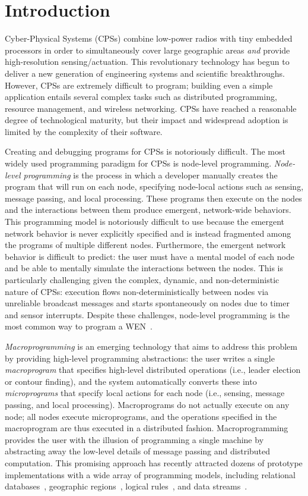 \chapter{Introduction}

Cyber-Physical Systems (CPSs) combine low-power radios with tiny embedded
processors in order to simultaneously cover large geographic areas {\em and}
provide high-resolution sensing/actuation.  This revolutionary technology has
begun to deliver a new generation of engineering systems and scientific
breakthroughs.  However, CPSs are extremely difficult to program; building even
a simple application entails several complex tasks such as distributed
programming, resource management, and wireless networking.  CPSs have reached a
reasonable degree of technological maturity, but their impact and widespread
adoption is limited by the complexity of their software.

Creating and debugging programs for CPSs is notoriously difficult. The most
widely used programming paradigm for CPSs is node-level
programming. \emph{Node-level programming} is the process in which a developer
manually creates the program that will run on each node, specifying node-local
actions such as sensing, message passing, and local processing.  These programs
then execute on the nodes and the interactions between them produce emergent,
network-wide behaviors.  This programming model is notoriously difficult to use
because the emergent network behavior is never explicitly specified and is
instead fragmented among the programs of multiple different nodes.  Furthermore,
the emergent network behavior is difficult to predict: the user must have a
mental model of each node and be able to mentally simulate the interactions
between the nodes.  This is particularly challenging given the complex, dynamic,
and non-deterministic nature of CPSs: execution flows non-deterministically
between nodes via unreliable broadcast messages and starts spontaneously on
nodes due to timer and sensor interrupts.  Despite these challenges, node-level
programming is the most common way to program a
WEN~\cite{Gay,bhatti2005mem,dunkels2004cla}.

{\em Macroprogramming} is an emerging technology that aims to address this
problem by providing high-level programming abstractions: the user writes a
single {\em macroprogram} that specifies high-level distributed operations
(i.e., leader election or contour finding), and the system automatically
converts these into \emph{microprograms} that specify local actions for each
node (i.e., sensing, message passing, and local processing).  Macroprograms do
not actually execute on any node; all nodes execute microprograms, and the
operations specified in the macroprogram are thus executed in a distributed
fashion.  Macroprogramming provides the user with the illusion of programming a
single machine by abstracting away the low-level details of message passing and
distributed computation.  This promising approach has recently attracted dozens
of prototype implementations with a wide array of programming models, including
relational databases~\cite{Madden}, geographic regions~\cite{Welsh2004}, logical
rules~\cite{Chu2007}, and data streams~\cite{Whitehouse}.

